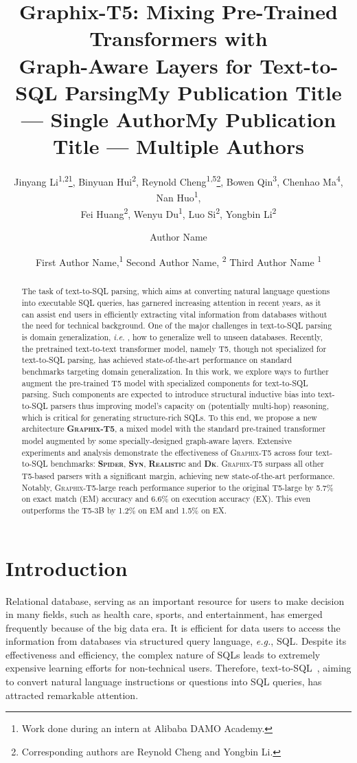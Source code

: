\documentclass[letterpaper]{article} \usepackage{aaai23}  \usepackage{times}  \usepackage{helvet}  \usepackage{courier}  \usepackage[hyphens]{url}  \usepackage{graphicx} \usepackage{amsmath}
\title{Graphix-T5: Mixing Pre-Trained Transformers with \\ Graph-Aware Layers for Text-to-SQL Parsing}
\author{
Jinyang Li\textsuperscript{\rm 1,2}\thanks{\quad Work done during an intern at Alibaba DAMO Academy.
},
    Binyuan Hui\textsuperscript{\rm 2},
    Reynold Cheng\textsuperscript{\rm 1,5}\thanks{\quad \small Corresponding authors are Reynold Cheng and Yongbin Li.},
    Bowen Qin\textsuperscript{\rm 3},
    Chenhao Ma\textsuperscript{\rm 4},
    Nan Huo\textsuperscript{\rm 1}, \\
    Fei Huang\textsuperscript{\rm 2}, 
    Wenyu Du\textsuperscript{\rm 1},
    Luo Si\textsuperscript{\rm 2},
    Yongbin Li\textsuperscript{\rm 2} \footnotemark[2]
}
\title{My Publication Title --- Single Author}
\author {
    Author Name
}
\title{My Publication Title --- Multiple Authors}
\author {
First Author Name,\textsuperscript{\rm 1}
    Second Author Name, \textsuperscript{\rm 2}
    Third Author Name \textsuperscript{\rm 1}
}
\newcommand{\graphix}{\textsc{Graphix}\xspace}
\def\eg{\emph{e.g.}}
\def\ie{\emph{i.e. }}
\begin{document}
\maketitle

\begin{abstract}
The task of text-to-SQL parsing, which aims at converting natural language questions into executable SQL queries, has garnered increasing attention in recent years, as it can assist end users in efficiently extracting vital information from databases without the need for technical background. 
One of the major challenges in text-to-SQL parsing is domain generalization, \ie, how to generalize well to unseen databases. 
Recently, the pretrained text-to-text transformer model, namely T5, though not specialized for text-to-SQL parsing, has achieved state-of-the-art performance on standard benchmarks targeting domain generalization.
In this work, we explore ways to further augment the pre-trained T5 model with specialized components for text-to-SQL parsing.
Such components are expected to introduce structural inductive bias into text-to-SQL parsers thus improving model's capacity on (potentially multi-hop) reasoning, which is critical for generating structure-rich SQLs. 
To this end, we propose a new architecture \textbf{\graphix-T5}, a mixed model with the standard pre-trained transformer model augmented by some specially-designed graph-aware layers.
Extensive experiments and analysis demonstrate the effectiveness of \graphix-T5 across four text-to-SQL benchmarks: \textsc{\textbf{Spider}}, \textsc{\textbf{Syn}}, \textsc{\textbf{Realistic}} and \textsc{\textbf{Dk}}.
\graphix-T5 surpass all other T5-based parsers with a significant margin, achieving new state-of-the-art performance. 
Notably, \graphix-T5-large reach performance superior to the original T5-large by 5.7\% on exact match (EM) accuracy and 6.6\% on execution accuracy (EX). This even outperforms the T5-3B by 1.2\% on EM and 1.5\% on EX. 
\end{abstract}


\section{Introduction}
Relational database, serving as an important resource for users to make decision in many fields, such as health care, sports, and entertainment, has emerged frequently because of the big data era.
It is efficient for data users to access the information from databases via structured query language, \eg, SQL. Despite its effectiveness and efficiency, the complex nature of SQLs leads to extremely expensive learning efforts for non-technical users.
Therefore, text-to-SQL~\citep{ijcai2018-553, geoquery, xu2017sqlnet, yu-etal-2018-typesql, yaghmazadeh2017sqlizer}, aiming to convert natural language instructions or questions into SQL queries, has attracted remarkable attention. 
\end{document}
